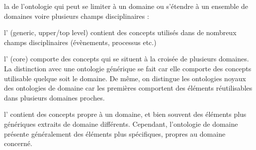 \begin{listeni}
	\item la  de l'ontologie qui peut se limiter à un domaine ou s'étendre à un ensemble de domaines voire plusieurs champs disciplinaires : 
	\begin{liste}
		\item l' (generic, upper/top level) contient des concepts utilisés dans de nombreux champs disciplinaires (évènements, processus etc.)
		\item l' (core) comporte des concepts qui se situent à la croisée de plusieurs domaines. 
		La distinction avec une ontologie générique se fait car elle comporte des concepts utilisable quelque soit le domaine.
		De même, on distingue les ontologies noyaux des ontologies de domaine car les premières comportent des éléments réutilisables dans plusieurs domaines proches. 
		\item l' contient des concepts propre à un domaine, et bien souvent des éléments plus génériques extraits de domaine différents.
		Cependant, l'ontologie de domaine présente généralement des éléments plus spécifiques, propres au domaine concerné. 
	\end{liste}
\end{listeni}